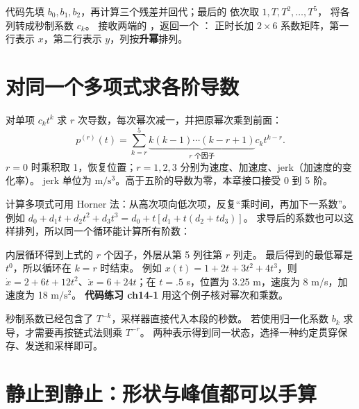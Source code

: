 \par\noindent\begin{minipage}{\linewidth}

\end{minipage}\par
代码先填 $b_0,b_1,b_2$，再计算三个残差并回代；最后的  依次取 $1,T,T^2,\ldots,T^5$，
将各列转成秒制系数 $c_k$。
 接收两端的 ，返回一个 ：
正时长加 $2\times6$ 系数矩阵，第一行表示 $x$，第二行表示 $y$，列按\textbf{升幂}排列。

\section{对同一个多项式求各阶导数}
对单项 $c_k t^k$ 求 $r$ 次导数，每次幂次减一，并把原幂次乘到前面：
\begin{equation}
p^{(r)}(t)=\sum_{k=r}^5
\underbrace{k(k-1)\cdots(k-r+1)}_{r\text{ 个因子}}c_k t^{k-r}.
\end{equation}
$r=0$ 时乘积取 1，恢复位置；$r=1,2,3$ 分别为速度、加速度、jerk（加速度的变化率）。
jerk 单位为 $\mathrm{m/s^3}$。高于五阶的导数为零，本章接口接受 0 到 5 阶。

计算多项式可用 Horner 法：从高次项向低次项，反复“乘时间，再加下一系数”。
例如 $d_0+d_1t+d_2t^2+d_3t^3=d_0+t[d_1+t(d_2+td_3)]$。
求导后的系数也可以这样排列，所以同一个循环能计算所有阶数：

\par\noindent\begin{minipage}{\linewidth}

\end{minipage}\par
内层循环得到上式的 $r$ 个因子，外层从第 5 列往第 $r$ 列走。
最后得到的最低幂是 $t^0$，所以循环在 $k=r$ 时结束。
例如 $x(t)=1+2t+3t^2+4t^3$，则
$\dot x=2+6t+12t^2$、$\ddot x=6+24t$；在 $t=.5$ s，位置为 3.25 m，速度为 8 m/s，加速度为 18 $\mathrm{m/s^2}$。
\textbf{代码练习 ch14-1} 用这个例子核对幂次和乘数。

秒制系数已经包含了 $T^{-k}$，采样器直接代入本段的秒数。
若使用归一化系数 $b_k$ 求导，才需要再按链式法则乘 $T^{-r}$。
两种表示得到同一状态，选择一种约定贯穿保存、发送和采样即可。

\section{静止到静止：形状与峰值都可以手算}
